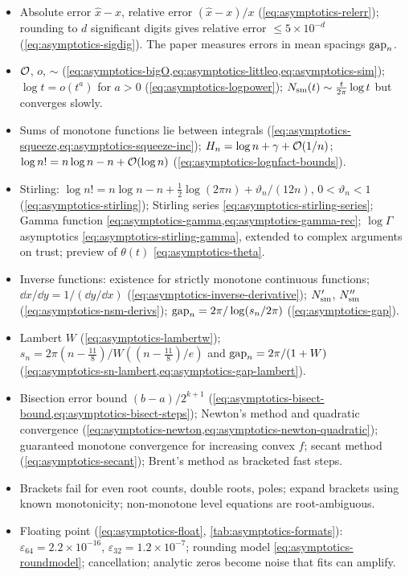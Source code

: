 \begin{itemize}
\item Absolute error $\hat x-x$, relative error $(\hat x-x)/x$ (\cref{eq:asymptotics-relerr}); rounding to $d$ significant digits gives relative error $\le5\times10^{-d}$ (\cref{eq:asymptotics-sigdig}). The paper measures errors in mean spacings $\mathrm{gap}_n$.
\item $\mathcal{O}$, $o$, $\sim$ (\cref{eq:asymptotics-bigO,eq:asymptotics-littleo,eq:asymptotics-sim}); $\log t=o(t^a)$ for $a>0$ (\cref{eq:asymptotics-logpower}); $N_{\mathrm{sm}}(t)\sim\frac{t}{2\pi}\log t$ but converges slowly.
\item Sums of monotone functions lie between integrals (\cref{eq:asymptotics-squeeze,eq:asymptotics-squeeze-inc}); $H_n=\log n+\gamma+\mathcal{O}(1/n)$; $\log n!=n\log n-n+\mathcal{O}(\log n)$ (\cref{eq:asymptotics-lognfact-bounds}).
\item Stirling: $\log n!=n\log n-n+\tfrac12\log(2\pi n)+\vartheta_n/(12n)$, $0<\vartheta_n<1$ (\cref{eq:asymptotics-stirling}); Stirling series \cref{eq:asymptotics-stirling-series}; Gamma function \cref{eq:asymptotics-gamma,eq:asymptotics-gamma-rec}; $\log\Gamma$ asymptotics \cref{eq:asymptotics-stirling-gamma}, extended to complex arguments on trust; preview of $\theta(t)$ \cref{eq:asymptotics-theta}.
\item Inverse functions: existence for strictly monotone continuous functions; $\dd x/\dd y=1/(\dd y/\dd x)$ (\cref{eq:asymptotics-inverse-derivative}); $N_{\mathrm{sm}}'$, $N_{\mathrm{sm}}''$ (\cref{eq:asymptotics-nsm-derivs}); $\mathrm{gap}_n=2\pi/\log(s_n/2\pi)$ (\cref{eq:asymptotics-gap}).
\item Lambert $W$ (\cref{eq:asymptotics-lambertw}); $s_n=2\pi(n-\frac{11}8)/W((n-\frac{11}8)/e)$ and $\mathrm{gap}_n=2\pi/(1+W)$ (\cref{eq:asymptotics-sn-lambert,eq:asymptotics-gap-lambert}).
\item Bisection error bound $(b-a)/2^{k+1}$ (\cref{eq:asymptotics-bisect-bound,eq:asymptotics-bisect-steps}); Newton's method and quadratic convergence (\cref{eq:asymptotics-newton,eq:asymptotics-newton-quadratic}); guaranteed monotone convergence for increasing convex $f$; secant method (\cref{eq:asymptotics-secant}); Brent's method as bracketed fast steps.
\item Brackets fail for even root counts, double roots, poles; expand brackets using known monotonicity; non-monotone level equations are root-ambiguous.
\item Floating point (\cref{eq:asymptotics-float}, \cref{tab:asymptotics-formats}): $\varepsilon_{64}=2.2\times10^{-16}$, $\varepsilon_{32}=1.2\times10^{-7}$; rounding model \cref{eq:asymptotics-roundmodel}; cancellation; analytic zeros become noise that fits can amplify.
\end{itemize}

